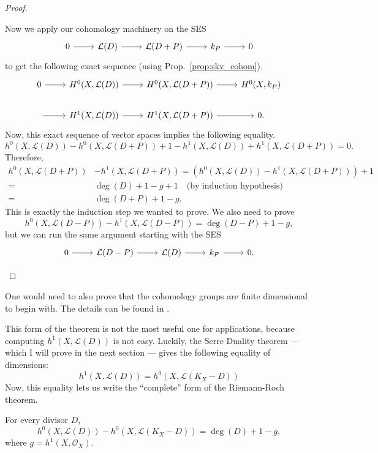 \begin{proof}
\begin{description}[style=nextline]
          Now we apply our cohomology machinery on the SES
          \[
          \begin{tikzcd}
            0\arrow{r} & \mathcal{L}(D)\arrow{r} & \mathcal{L}(D+P)\arrow{r}
            & k_{P}\arrow{r} & 0
          \end{tikzcd}
          \]
          to get the following exact sequence (using
          Prop.~\ref{prop:sky_cohom}).
          \[
          \begin{tikzcd}
            0\arrow{r} & H^{0}(X, \mathcal{L}(D))\arrow{r}
            & H^{0}(X, \mathcal{L}(D+P))\arrow{r}
            & H^{0}(X, k_{P}) \\
            \arrow{r} & H^{1}(X, \mathcal{L}(D))\arrow{r}
            & H^{1}(X, \mathcal{L}(D+P))\arrow{r} & 0.
          \end{tikzcd}
          \]
          Now, this exact sequence of vector spaces implies the following
          equality.
          \[
          h^{0}(X,\mathcal{L}(D))-h^{0}(X, \mathcal{L}(D+P))
          +1-h^{1}(X,\mathcal{L}(D))+h^{1}(X,\mathcal{L}(D+P)) = 0.
          \]
          Therefore,
          \begin{align*}
            h^{0}(X,\mathcal{L}(D+P))&-h^{1}(X,\mathcal{L}(D+P))
            =\left(h^{0}(X,\mathcal{L}(D))-h^{1}(X,\mathcal{L}(D+P))\right)
              +1 \\
            =&\deg(D)+1-g+1\quad\text{(by induction hypothesis)} \\
            =&\deg(D+P)+1-g.
          \end{align*}
          This is exactly the induction step we wanted to prove.
          We also need to prove
          \[
            h^{0}(X,\mathcal{L}(D-P))-h^{1}(X,\mathcal{L}(D-P))
            =\deg(D-P)+1-g,
          \]
          but we can run the same argument starting with the SES
          \[
          \begin{tikzcd}
            0\arrow{r} & \mathcal{L}(D-P)\arrow{r} & \mathcal{L}(D)\arrow{r}
            & k_{P}\arrow{r} & 0.
          \end{tikzcd}
          \]
  \end{description}
\end{proof}
\begin{rem}
  One would need to also prove that the cohomology groups are finite
  dimensional to begin with. The details can be found in \cite{serre}.
\end{rem}

This form of the theorem is not the most useful one for applications,
because computing $h^{1}(X,\mathcal{L}(D))$ is not easy. Luckily, the Serre
Duality theorem --- which I will prove in the next section --- gives the
following equality of dimensions:
\[h^{1}(X,\mathcal{L}(D))=h^{0}(X,\mathcal{L}(K_{X}-D))\]
Now, this equality lets us write the ``complete'' form of the Riemann-Roch
theorem.
\begin{thm}\label{thm:riemann_roch}
  For every divisor $D$,
  \[
    h^{0}(X, \mathcal{L}(D))-h^{0}(X, \mathcal{L}(K_{X}-D))=\deg(D)+1-g,
  \]
  where $g=h^{1}(X, \mathcal{O}_{X})$.
\end{thm}

